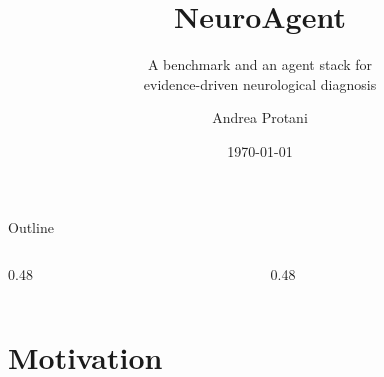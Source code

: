 \documentclass[aspectratio=169,t]{beamer}
\title{NeuroAgent}
\subtitle{A benchmark and an agent stack for\\
          evidence-driven neurological diagnosis}
\author{Andrea Protani}
\date{\today}
\begin{document}
\maketitle

\begin{frame}{Outline}
  \vspace{2mm}
  \begin{columns}[T,onlytextwidth]
    \begin{column}{0.48\textwidth}
      \tableofcontents[sections={1-3},hideallsubsections]
    \end{column}%
    \hfill
    \begin{column}{0.48\textwidth}
      \tableofcontents[sections={4-6},hideallsubsections]
    \end{column}
  \end{columns}
\end{frame}

\section{Motivation}
\end{document}

